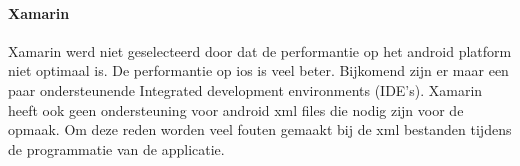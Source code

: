 \paragraph{Xamarin}
Xamarin werd niet geselecteerd door dat de performantie op het android platform niet optimaal is. De performantie op ios is veel beter. Bijkomend zijn er maar een paar ondersteunende Integrated development environments (IDE’s). Xamarin heeft ook geen ondersteuning voor android xml files die nodig zijn voor de opmaak. Om deze reden worden veel fouten gemaakt bij de xml bestanden tijdens de programmatie van de applicatie. \cite{KOTIN_VS_XAMARIN}
